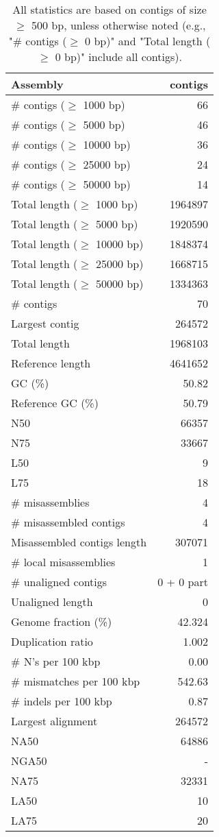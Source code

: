 \documentclass[12pt,a4paper]{article}
\begin{document}
\begin{table}[ht]
\begin{center}
\caption{All statistics are based on contigs of size $\geq$ 500 bp, unless otherwise noted (e.g., "\# contigs ($\geq$ 0 bp)" and "Total length ($\geq$ 0 bp)" include all contigs).}
\begin{tabular}{|l*{1}{|r}|}
\hline
Assembly & contigs \\ \hline
\# contigs ($\geq$ 1000 bp) & 66 \\ \hline
\# contigs ($\geq$ 5000 bp) & 46 \\ \hline
\# contigs ($\geq$ 10000 bp) & 36 \\ \hline
\# contigs ($\geq$ 25000 bp) & 24 \\ \hline
\# contigs ($\geq$ 50000 bp) & 14 \\ \hline
Total length ($\geq$ 1000 bp) & 1964897 \\ \hline
Total length ($\geq$ 5000 bp) & 1920590 \\ \hline
Total length ($\geq$ 10000 bp) & 1848374 \\ \hline
Total length ($\geq$ 25000 bp) & 1668715 \\ \hline
Total length ($\geq$ 50000 bp) & 1334363 \\ \hline
\# contigs & 70 \\ \hline
Largest contig & 264572 \\ \hline
Total length & 1968103 \\ \hline
Reference length & 4641652 \\ \hline
GC (\%) & 50.82 \\ \hline
Reference GC (\%) & 50.79 \\ \hline
N50 & 66357 \\ \hline
N75 & 33667 \\ \hline
L50 & 9 \\ \hline
L75 & 18 \\ \hline
\# misassemblies & 4 \\ \hline
\# misassembled contigs & 4 \\ \hline
Misassembled contigs length & 307071 \\ \hline
\# local misassemblies & 1 \\ \hline
\# unaligned contigs & 0 + 0 part \\ \hline
Unaligned length & 0 \\ \hline
Genome fraction (\%) & 42.324 \\ \hline
Duplication ratio & 1.002 \\ \hline
\# N's per 100 kbp & 0.00 \\ \hline
\# mismatches per 100 kbp & 542.63 \\ \hline
\# indels per 100 kbp & 0.87 \\ \hline
Largest alignment & 264572 \\ \hline
NA50 & 64886 \\ \hline
NGA50 & - \\ \hline
NA75 & 32331 \\ \hline
LA50 & 10 \\ \hline
LA75 & 20 \\ \hline
\end{tabular}
\end{center}
\end{table}
\end{document}
